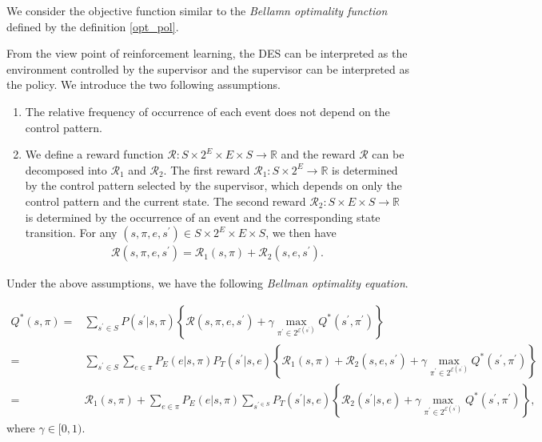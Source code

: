 We consider the objective function similar to the {\it Bellamn optimality function} defined by the definition \ref{opt_pol}.
\begin{definition}

  From the view point of reinforcement learning, the DES can be interpreted as the environment controlled by the supervisor and the supervisor can be interpreted as the policy. We introduce the two following assumptions.

  \begin{enumerate}
    \item The relative frequency of occurrence of each event does not depend on the control pattern.
    \item We define a reward function $\mathcal{R} : S \times 2^E \times E \times S \rightarrow \mathbb{R}$ and the reward $\mathcal{R}$ can be decomposed into $\mathcal{R}_1$ and $\mathcal{R}_2$. The first reward $\mathcal{R}_1 : S \times 2^E \rightarrow \mathbb{R}$ is determined by the control pattern selected by the supervisor, which depends on only the control pattern and the current state. The second reward $\mathcal{R}_2 : S \times E \times S \rightarrow \mathbb{R}$ is determined by the occurrence of an event and the corresponding state transition. For any $(s,\pi,e,s^{\prime}) \in S \times 2^E \times E \times S$, we then have
    \begin{align}
      \mathcal{R}(s,\pi,e,s^{\prime}) = \mathcal{R}_1(s,\pi) + \mathcal{R}_2(s,e,s^{\prime}).
    \end{align}
  \end{enumerate}
  Under the above assumptions, we have the following {\it Bellman optimality equation}.

  \begin{align}
    Q^{\ast}(s,\pi) = & \sum_{s^{\prime} \in S} P(s^{\prime}|s,\pi)\left \{ \mathcal{R}(s,\pi,e,s^{\prime}) + \gamma \max_{\pi^{\prime} \in 2^{\mathcal{E}(s^{\prime})}} Q^{\ast}(s^{\prime},\pi^{\prime}) \right \} \nonumber \\
    = & \sum_{s^{\prime} \in S} \sum_{e \in \pi} P_E(e|s,\pi) P_T(s^{\prime}|s,e) \left \{ \mathcal{R}_1(s,\pi) + \mathcal{R}_2(s,e,s^{\prime}) + \gamma \max_{\pi^{\prime} \in 2^{\mathcal{E}(s^{\prime})}} Q^{\ast}(s^{\prime},\pi^{\prime}) \right \} \nonumber \\
    = & \mathcal{R}_1(s,\pi) + \sum_{e \in \pi} P_E(e|s,\pi) \sum_{s^{\prime \in S}} P_T(s^{\prime}|s,e) \left \{ \mathcal{R}_2(s^{\prime}|s,e) + \gamma \max_{\pi^{\prime} \in 2^{\mathcal{E}(s^{\prime})}} Q^{\ast}(s^{\prime}, \pi^{\prime}) \right \},
  \end{align}
  where $\gamma \in [0,1)$.


\end{definition}
